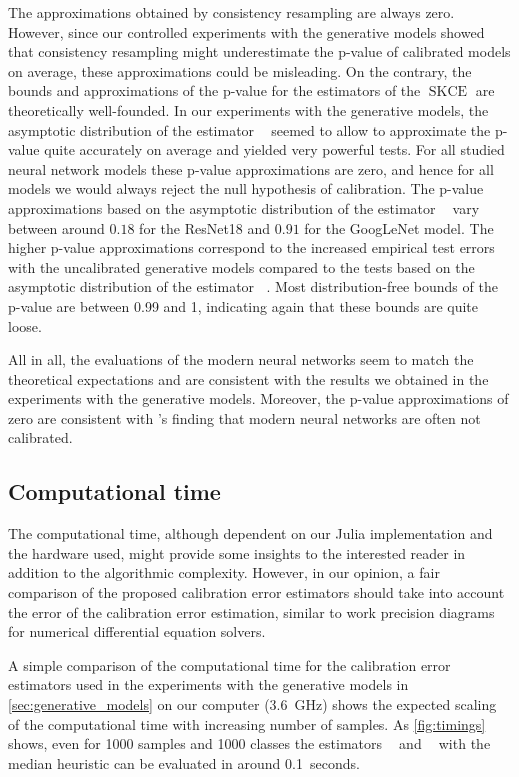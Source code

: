 \documentclass{article}
\DeclareMathOperator{\squaredkernelmeasure}{SKCE}
\DeclareMathOperator{\biasedestimator}{\widehat{SKCE}_b}
\DeclareMathOperator{\unbiasedestimator}{\widehat{SKCE}_{uq}}
\DeclareMathOperator{\linearestimator}{\widehat{SKCE}_{ul}}
\begin{document}
The approximations obtained by consistency resampling are always zero.
However, since our controlled experiments with the generative models showed that
consistency resampling might underestimate the p-value of calibrated
models on average, these approximations could be misleading. On the contrary, the
bounds and approximations of the p-value for the estimators of the
$\squaredkernelmeasure$ are theoretically well-founded. In our experiments with
the generative models, the asymptotic distribution of the estimator
$\unbiasedestimator$ seemed to allow to approximate the p-value quite accurately
on average and yielded very powerful tests. For all studied neural network models
these p-value approximations are zero, and hence for all models we would always
reject the null hypothesis of calibration. The p-value approximations based on
the asymptotic distribution of the estimator $\linearestimator$ vary between
around $0.18$ for the ResNet18 and $0.91$ for the GoogLeNet model. The higher
p-value approximations correspond to the increased empirical test errors with the
uncalibrated generative models compared to the tests based on the asymptotic
distribution of the estimator $\unbiasedestimator$. Most distribution-free
bounds of the p-value are between 0.99 and 1, indicating again that these bounds
are quite loose.

All in all, the evaluations of the modern neural networks seem to match the
theoretical expectations and are consistent with the results we obtained in
the experiments with the generative models. Moreover, the p-value
approximations of zero are consistent with \citet{guo17_calib_moder_neural_networ}'s
finding that modern neural networks are often not calibrated.

\subsection{Computational time}\label{sec:computational_time}

The computational time, although dependent on our Julia implementation and
the hardware used, might provide some insights to the interested reader in
addition to the algorithmic complexity. However, in our opinion, a fair
comparison of the proposed calibration error estimators should take into
account the error of the calibration error estimation, similar to work
precision diagrams for numerical differential equation solvers.

A simple comparison of the computational time for the calibration error
estimators used in the experiments with the generative models in
\cref{sec:generative_models} on our computer (3.6~GHz) shows the expected
scaling of the computational time with increasing number of samples. As
\cref{fig:timings} shows, even for 1000 samples and 1000 classes the estimators
$\biasedestimator$ and $\unbiasedestimator$ with the median heuristic can be
evaluated in around 0.1~seconds.
\end{document}
